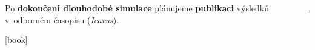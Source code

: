 \documentclass{beamer}
\newlength{\sep}
\newlength{\vyska}
\newlength{\vyskaC}
\newlength{\side}
\begin{document}
\begin{frame}
\begin{columns}[t]
\begin{column}{\side}
\begin{tcolorbox}[title=Stáří rodiny Eunomia\phantom{Úy},height=0.75\vyskaC]
	Po \textbf{dokončení dlouhodobé simulace} plánujeme \textbf{publikaci} výsledků v~odborném časopisu (\textit{Icarus}).

\end{tcolorbox}
\vspace{\sep}
\begin{tcolorbox}[title=Reference\phantom{Úy},height=0.25\vyskaC]
	\printbibliography

	\tcblower

	\newrefsection{}
	[book]
	\nocite{fmt}
	\nocite{murray00}
	\nocite{brozphd}
	\printbibliography
\end{tcolorbox}
\end{column}

\begin{column}{\sep}
\end{column}

\end{columns}

\end{frame}
\end{document}
